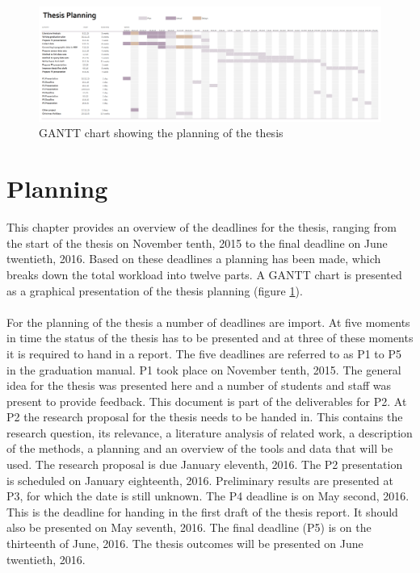 

\begin{figure}
	\centering
	\includegraphics[width=1.5\linewidth, angle=90]{figs/GANTT-chart.png}
	\caption{GANTT chart showing the planning of the thesis}
	\label{fig:GANTT}
\end{figure}

\section{Planning}
\label{chap:planning}

This chapter provides an overview of the deadlines for the thesis, ranging from the start of the thesis on November tenth, 2015 to the final deadline on June twentieth, 2016. Based on these deadlines a planning has been made, which breaks down the total workload into twelve parts. A GANTT chart is presented as a graphical presentation of the thesis planning (figure \ref{fig:GANTT}). \\ \mbox{} \\
For the planning of the thesis a number of deadlines are import. At five moments in time the status of the thesis has to be presented and at three of these moments it is required to hand in a report. The five deadlines are referred to as P1 to P5 in the graduation manual. P1 took place on November tenth, 2015. The general idea for the thesis was presented here and a number of students and staff was present to provide feedback. This document is part of the deliverables for P2. At P2 the research proposal for the thesis needs to be handed in. This contains the research question, its relevance, a literature analysis of related work, a description of the methods, a planning and an overview of the tools and data that will be used. The research proposal is due January eleventh, 2016. The P2 presentation is scheduled on January eighteenth, 2016. Preliminary results are presented at P3, for which the date is still unknown. The P4 deadline is on May second, 2016. This is the deadline for handing in the first draft of the thesis report. It should also be presented on May seventh, 2016. The final deadline (P5) is on the thirteenth of June, 2016. The thesis outcomes will be presented on June twentieth, 2016.

